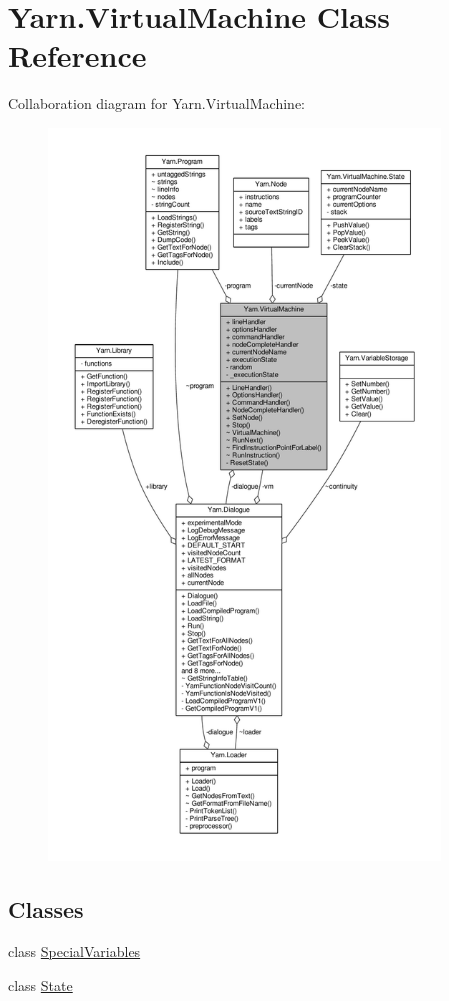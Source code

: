 \hypertarget{a00164}{\section{Yarn.\-Virtual\-Machine Class Reference}
\label{a00164}
}


Collaboration diagram for Yarn.\-Virtual\-Machine\-:
\nopagebreak
\begin{figure}[H]
\begin{center}
\leavevmode
\includegraphics[height=550pt]{a00727}
\end{center}
\end{figure}
\subsection*{Classes}
\begin{DoxyCompactItemize}
\item 
class \hyperlink{a00164_a00384}{Special\-Variables}
\item 
class \hyperlink{a00167}{State}
\end{DoxyCompactItemize}
